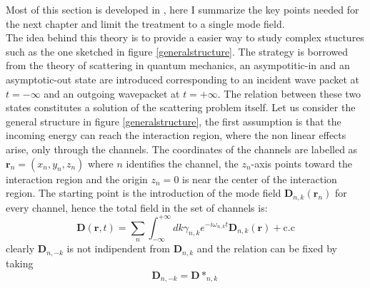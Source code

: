 \documentclass[12pt]{book}
\renewcommand{\r}{\mathbf{r}}
\begin{document}
Most of this section is developed in \cite{Liscidini2012}, here I summarize the key points needed for the next chapter and limit the treatment to a single mode field.\\ The idea behind this theory is to provide a easier way to study complex stuctures such as the one sketched in figure \ref{generalstructure}. The strategy is borrowed from the theory of scattering in quantum mechanics, an asympotitic-in and an asymptotic-out state are introduced corresponding to an incident wave packet at $t = -\infty$ and an outgoing wavepacket at $t = +\infty$. The relation between these two states constitutes a solution of the scattering problem itself. Let us consider the general structure in figure \ref{generalstructure}, the first assumption is that the incoming energy can reach the interaction region, where the non linear effects arise, only through the channels. The coordinates of the channels are labelled as $\r_n = (x_n,y_n,z_n)$ where $n$ identifies the channel, the $z_n$-axis points toward the interaction region and the origin $z_n = 0$ is near the center of the interaction region. The starting point is the introduction of the mode field $\mathbf{D}_{n,k}(\r_n)$ for every channel, hence the total field in the set of channels is:
\begin{equation}\mathbf{D}(\r,t) = \sum_n\int_{-\infty}^{+\infty}dk \gamma_{n,k} e^{-i\omega_{n,k}t}\mathbf{D}_{n,k}(\r)  + \text{c.c}\end{equation}
clearly $\mathbf{D}_{n,-k}$ is not indipendent from $\mathbf{D}_{n,k}$ and the relation can be fixed by taking
\begin{equation}\label{ddstar}\mathbf{D}_{n,-k} = \mathbf{D}*_{n,k}\end{equation}
\end{document}
